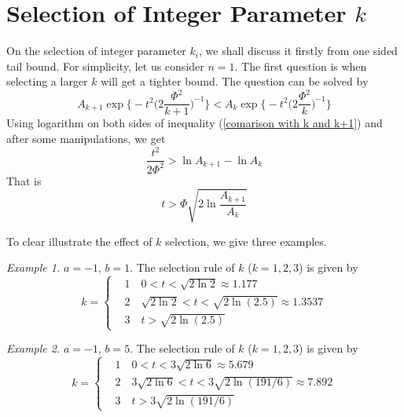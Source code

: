 \documentclass[journal]{IEEEtran}
\begin{document}

\section{Selection of Integer Parameter $k$}

On the selection of integer parameter $k_i$, we shall discuss it firstly from one sided tail bound.
For simplicity, let us consider $n=1$. The first question is when selecting a larger $k$ will get a tighter bound.
The question can be solved by
\begin{equation}\label{comarison with k and k+1}
A_{k+1}\exp\Big\{-t^2\Big(2\frac{\Phi^2}{k+1}\Big)^{-1}\Big\}< A_{k}\exp\Big\{-t^2\Big(2\frac{\Phi^2}{k}\Big)^{-1}\Big\}
\end{equation}
Using logarithm on both sides of inequality (\ref{comarison with k and k+1}) and after some manipulations,  we get
\begin{equation}
\frac{t^2}{2\Phi^2}> \ln A_{k+1}-\ln A_k
\end{equation}
 That is
 \begin{equation}
 t > \Phi \sqrt{2 \ln \frac{A_{k+1}}{A_k}}
 \end{equation}

 To clear illustrate the effect of $k$ selection, we give three examples.

\emph{Example 1.}  $a= -1$, $b=1$.  The selection  rule of $k$ ($k=1,2,3$) is given by
\begin{equation}
k=
\begin{cases}
{}&1 \quad 0<t< \sqrt{2\ln2}\approx 1.177{} \\
 & 2 \quad  \sqrt{2\ln2} <t< \sqrt{2\ln (2.5)}\approx 1.3537\\
 & 3 \quad  t > \sqrt{2\ln (2.5)}
\end{cases}
\end{equation}

 \emph{Example 2.}  $a= -1$, $b=5$.  The selection  rule of $k$ ($k=1,2,3$) is given by
\begin{equation}
k=
\begin{cases}
{}&1 \quad 0<t< 3\sqrt{2\ln6}\approx 5.679{} \\
 & 2 \quad  3\sqrt{2\ln6} <t< 3\sqrt{2\ln (191/6)}\approx7.892 \\
 & 3 \quad  t > 3\sqrt{2\ln (191/6)}
\end{cases}
\end{equation}
\end{document}
